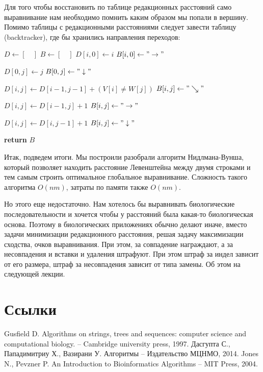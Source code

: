 \documentclass[letterpaper, 11pt]{article}
\begin{document}
Для того чтобы восстановить по таблице редакционных расстояний само выравнивание нам необходимо помнить каким образом мы попали в вершину. Помимо таблицы с редакционными расстояниями следует завести таблицу (backtracker), где бы хранились направления переходов:

\begin{algorithmic}[2]
\State $D\gets [\quad]$
\State $B\gets [\quad]$
\State $D[i,0]\gets i$
\State $B[i,0]\gets "\rightarrow"$
\EndFor

\State $D[0,j]\gets j$
\State $B[0,j]\gets "\downarrow"$
\EndFor


\State $D[i,j]\gets D[i-1,j-1]+(V[i]\ne W[j])$
\State $B[i,j]\gets "\searrow"$

\State$D[i,j]\gets D[i-1,j]+1$
\State $B[i,j]\gets "\rightarrow"$
\EndIf

\State$D[i,j]\gets D[i,j-1]+1$
\State $B[i,j]\gets "\downarrow"$
\EndIf

\EndFor
\EndFor
\State \textbf{return} $B$
\EndProcedure
\end{algorithmic}

Итак, подведем итоги. Мы построили разобрали алгоритм Нидлмана-Вунша, который позволяет находить расстояние Левенштейна между двумя строками и тем самым строить оптимальное глобальное выравнивание. Сложность такого алгоритма $O(nm)$, затраты по памяти также $O(nm)$.

Но этого еще недостаточно. Нам хотелось бы выравнивать биологические последовательности и хочется чтобы у расстояний была какая-то биологическая основа. Поэтому в биологических приложениях обычно делают иначе, вместо задачи минимизации редакционного расстояния, решая задачу максимизации сходства, очков выравнивания. При этом, за совпадение награждают, а за несовпадения и вставки и удаления штрафуют. При этом штраф за индел зависит от его размера, штраф за несовпадения зависит от типа замены. Об этом на следующей лекции.

\section{Ссылки}
\begingroup
\renewcommand{\section}[2]{}%
\begin{thebibliography}{7}
Gusfield D. Algorithms on strings, trees and sequences: computer science and computational biology. – Cambridge university press, 1997.
Дасгупта С., Пападимитриу Х., Вазирани У. Алгоритмы – Издательство МЦНМО, 2014.
Jones N., Pevzner P. An Introduction to Bioinformatics Algorithms – MIT Press, 2004.
\end{thebibliography}
\end{document}
